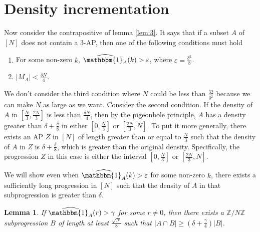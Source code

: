 \documentclass[12pt]{article}
\newtheorem{lem}[thm]{Lemma}
\theoremstyle{definition}
\newcommand{\vep}{\varepsilon}
\newcommand{\znz}{\mathbb{Z}/N\mathbb{Z}}
\newcommand{\indi}{\mathbbm{1}}
\begin{document}
\section{Density incrementation}
Now consider the contrapositive of lemma \ref{lem:3}. It says that if a subset $A$ of $[N]$ does not contain a $3$-AP, then one of the following conditions must hold
\begin{enumerate}
    \item For some non-zero $k$, $\widehat{\indi_A}(k) > \vep$, where $\vep = \frac{\delta^2}{8}$.
    \item $|M_A| < \frac{\delta N}{4}$.
\end{enumerate}
We don't consider the third condition where $N$ could be less than $\frac{32}{\delta^2}$ because we can make $N$ as large as we want. Consider the second condition. If the density of $A$ in $\left[ \frac{N}{3}, \frac{2N}{3} \right]$ is less than $\frac{\delta N}{4}$, then by the pigeonhole principle, $A$ has a density greater than $\delta + \frac{\delta}{8}$ in either $\left[ 0, \frac{N}{3} \right]$ or $\left[ \frac{2N}{3}, N \right]$. To put it more generally, there exists an AP $Z$ in $[N]$ of length greater than or equal to $\frac{N}{3}$ such that the density of $A$ in $Z$ is $\delta + \frac{\delta}{8}$, which is greater than the original density. Specifically, the progression $Z$ in this case is either the interval $\left[ 0, \frac{N}{3} \right]$ or $\left[ \frac{2N}{3}, N \right]$.

We will show even when $\widehat{\indi_A}(k) > \vep$ for some non-zero $k$, there exists a sufficiently long progression in $[N]$ such that the density of $A$ in that subprogression is greater than $\delta$.

\begin{lem} \label{dens:1}
    If $\widehat{\indi_A}(r) > \gamma$ for some $r \neq 0$, then there exists a $\znz$ subprogression $B$ of length at least $\frac{\sqrt{N}}{8}$ such that $|A \cap B| \geq \left( \delta + \frac{\gamma}{4} \right)|B| $.
\end{lem}
\end{document}
